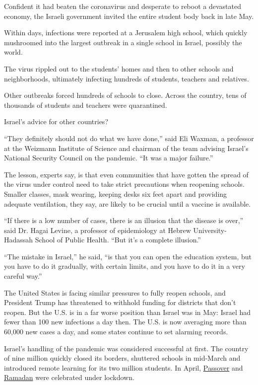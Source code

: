 Confident it had beaten the coronavirus and desperate to reboot a
devastated economy, the Israeli government invited the entire student
body back in late May.

Within days, infections were reported at a Jerusalem high school, which
quickly mushroomed into the largest outbreak in a single school in
Israel, possibly the world.

The virus rippled out to the students' homes and then to other schools
and neighborhoods, ultimately infecting hundreds of students, teachers
and relatives.

Other outbreaks forced hundreds of schools to close. Across the country,
tens of thousands of students and teachers were quarantined.

Israel's advice for other countries?

``They definitely should not do what we have done,'' said Eli Waxman, a
professor at the Weizmann Institute of Science and chairman of the team
advising Israel's National Security Council on the pandemic. ``It was a
major failure.''

The lesson, experts say, is that even communities that have gotten the
spread of the virus under control need to take strict precautions when
reopening schools. Smaller classes, mask wearing, keeping desks six feet
apart and providing adequate ventilation, they say, are likely to be
crucial until a vaccine is available.

``If there is a low number of cases, there is an illusion that the
disease is over,'' said Dr. Hagai Levine, a professor of epidemiology at
Hebrew University-Hadassah School of Public Health. ``But it's a
complete illusion.''

``The mistake in Israel,'' he said, ``is that you can open the education
system, but you have to do it gradually, with certain limits, and you
have to do it in a very careful way.''

The United States is facing similar pressures to fully reopen schools,
and President Trump has threatened to withhold funding for districts
that don't reopen. But the U.S. is in a far worse position than Israel
was in May: Israel had fewer than 100 new infections a day then. The
U.S. is now averaging more than 60,000 new cases a day, and some states
continue to set alarming records.

Israel's handling of the pandemic was considered successful at first.
The country of nine million quickly closed its borders, shuttered
schools in mid-March and introduced remote learning for its two million
students. In April,
\href{https://www.nytimes3xbfgragh.onion/2020/04/07/world/middleeast/coronavirus-passover-israel.html?searchResultPosition=1}{Passover}
and
\href{https://www.nytimes3xbfgragh.onion/2020/05/15/world/middleeast/ramadan-coronavirus-al-aqsa.html?searchResultPosition=1}{Ramadan}
were celebrated under lockdown.

